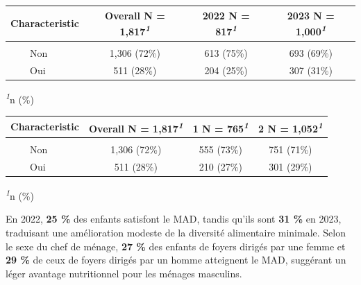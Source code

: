 \documentclass[
]{article}
\begin{document}
\begin{table}[!t]
\fontsize{9.8pt}{11.7pt}\selectfont
\begin{tabular*}{\linewidth}{@{\extracolsep{\fill}}lccc}
\toprule
\textbf{Characteristic} & \textbf{Overall}  N = 1,817\textsuperscript{\textit{1}} & \textbf{2022}  N = 817\textsuperscript{\textit{1}} & \textbf{2023}  N = 1,000\textsuperscript{\textit{1}} \\ 
\midrule\addlinespace[2.5pt]
{\bfseries MAD (≥ 5 groupes)} &  &  &  \\ 
    Non & 1,306 (72\%) & 613 (75\%) & 693 (69\%) \\ 
    Oui & 511 (28\%) & 204 (25\%) & 307 (31\%) \\ 
\bottomrule
\end{tabular*}
\begin{minipage}{\linewidth}
\textsuperscript{\textit{1}}n (\%)\\
\end{minipage}
\end{table}
\begin{table}[!t]
\fontsize{9.8pt}{11.7pt}\selectfont
\begin{tabular*}{\linewidth}{@{\extracolsep{\fill}}lccc}
\toprule
\textbf{Characteristic} & \textbf{Overall}  N = 1,817\textsuperscript{\textit{1}} & \textbf{1}  N = 765\textsuperscript{\textit{1}} & \textbf{2}  N = 1,052\textsuperscript{\textit{1}} \\ 
\midrule\addlinespace[2.5pt]
{\bfseries MAD (≥ 5 groupes)} &  &  &  \\ 
    Non & 1,306 (72\%) & 555 (73\%) & 751 (71\%) \\ 
    Oui & 511 (28\%) & 210 (27\%) & 301 (29\%) \\ 
\bottomrule
\end{tabular*}
\begin{minipage}{\linewidth}
\textsuperscript{\textit{1}}n (\%)\\
\end{minipage}
\end{table}

En 2022, \textbf{25 \%} des enfants satisfont le MAD, tandis qu'ils sont
\textbf{31 \%} en 2023, traduisant une amélioration modeste de la
diversité alimentaire minimale. Selon le sexe du chef de ménage,
\textbf{27 \%} des enfants de foyers dirigés par une femme et \textbf{29
\%} de ceux de foyers dirigés par un homme atteignent le MAD, suggérant
un léger avantage nutritionnel pour les ménages masculins.

\newpage
\end{document}
